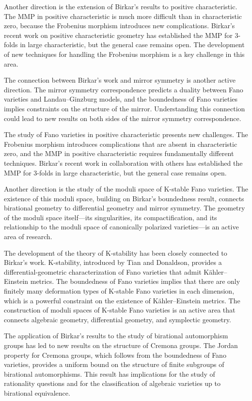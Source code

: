 Another direction is the extension of Birkar's results to positive characteristic. The MMP in positive characteristic is much more difficult than in characteristic zero, because the Frobenius morphism introduces new complications. Birkar's recent work on positive characteristic geometry has established the MMP for 3-folds in large characteristic, but the general case remains open. The development of new techniques for handling the Frobenius morphism is a key challenge in this area.

The connection between Birkar's work and mirror symmetry is another active direction. The mirror symmetry correspondence predicts a duality between Fano varieties and Landau--Ginzburg models, and the boundedness of Fano varieties implies constraints on the structure of the mirror. Understanding this connection could lead to new results on both sides of the mirror symmetry correspondence.

The study of Fano varieties in positive characteristic presents new challenges. The Frobenius morphism introduces complications that are absent in characteristic zero, and the MMP in positive characteristic requires fundamentally different techniques. Birkar's recent work in collaboration with others has established the MMP for 3-folds in large characteristic, but the general case remains open.

Another direction is the study of the moduli space of K-stable Fano varieties. The existence of this moduli space, building on Birkar's boundedness result, connects birational geometry to differential geometry and mirror symmetry. The geometry of the moduli space itself---its singularities, its compactification, and its relationship to the moduli space of canonically polarized varieties---is an active area of research.

The development of the theory of K-stability has been closely connected to Birkar's work. K-stability, introduced by Tian and Donaldson, provides a differential-geometric characterization of Fano varieties that admit K\"ahler--Einstein metrics. The boundedness of Fano varieties implies that there are only finitely many deformation types of K-stable Fano varieties in each dimension, which is a powerful constraint on the existence of K\"ahler--Einstein metrics. The construction of moduli spaces of K-stable Fano varieties is an active area that connects algebraic geometry, differential geometry, and symplectic geometry.

The application of Birkar's results to the study of birational automorphism groups has led to new results on the structure of Cremona groups. The Jordan property for Cremona groups, which follows from the boundedness of Fano varieties, provides a uniform bound on the structure of finite subgroups of birational automorphisms. This result has implications for the study of rationality questions and for the classification of algebraic varieties up to birational equivalence.

